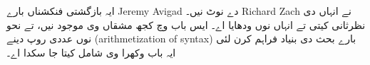 \documentclass[../../../include/open-logic-chapter]{subfiles}
\begin{document}

\begin{editorial}
  ایہ بازگشتی فنکشناں بارے Jeremy Avigad دے نوٹ نیں۔
  Richard Zach نے انہاں دی نظرثانی کیتی تے انہاں نوں ودھایا اے۔
  ایس باب وچ کجھ مشقاں وی موجود نیں، تے نحو نوں عددی روپ دینے
  (arithmetization of syntax) بارے بحث دی بنیاد فراہم کرن لئی
  ایہ باب وکھرا وی شامل کیتا جا سکدا اے۔
\end{editorial}





















\OLEndChapterHook
\end{document}
